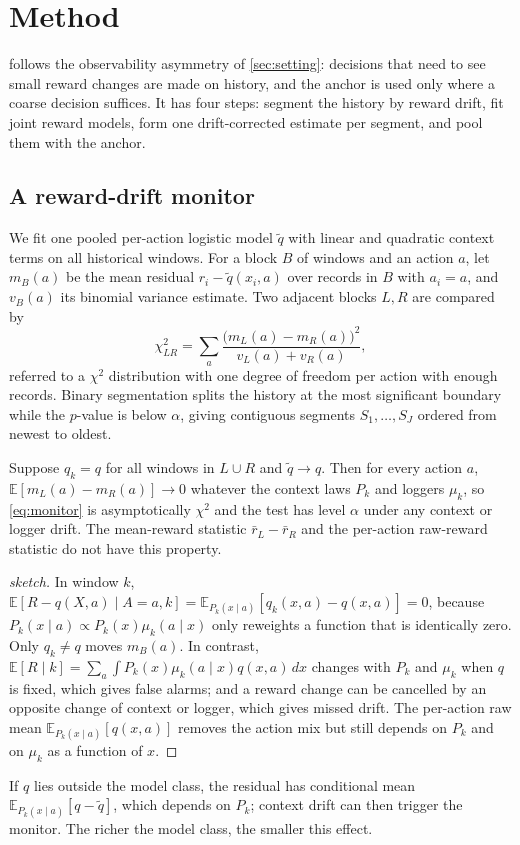 \section{Method}\label{sec:method}

\odrift{} follows the observability asymmetry of \cref{sec:setting}: decisions that need to
see small reward changes are made on history, and the anchor is used only where a coarse
decision suffices. It has four steps: segment the history by reward drift, fit joint
reward models, form one drift-corrected estimate per segment, and pool them with the anchor.

\subsection{A reward-drift monitor}
We fit one pooled per-action logistic model $\tilde q$ with linear and quadratic context
terms on all historical windows. For a block $B$ of windows and an action $a$, let
$m_B(a)$ be the mean residual $r_i-\tilde q(x_i,a)$ over records in $B$ with $a_i=a$, and
$v_B(a)$ its binomial variance estimate. Two adjacent blocks $L,R$ are compared by
\begin{equation}\label{eq:monitor}
  \chi^2_{LR}=\sum_{a}\frac{\big(m_L(a)-m_R(a)\big)^2}{v_L(a)+v_R(a)},
\end{equation}
referred to a $\chi^2$ distribution with one degree of freedom per action with enough
records. Binary segmentation splits the history at the most significant boundary while
the $p$-value is below $\alpha$, giving contiguous segments $S_1,\dots,S_J$ ordered from
newest to oldest.

\begin{proposition}\label{prop:invariance}
Suppose $q_k=q$ for all windows in $L\cup R$ and $\tilde q\to q$. Then for every action
$a$, $\mathbb{E}[m_L(a)-m_R(a)]\to0$ whatever the context laws $P_k$ and loggers $\mu_k$,
so \eqref{eq:monitor} is asymptotically $\chi^2$ and the test has level $\alpha$ under
any context or logger drift. The mean-reward statistic $\bar r_L-\bar r_R$ and the
per-action raw-reward statistic do not have this property.
\end{proposition}
\begin{proof}[sketch]
In window $k$, $\mathbb{E}[R-q(X,a)\mid A=a,k]=\mathbb{E}_{P_k(x\mid a)}[q_k(x,a)-q(x,a)]=0$,
because $P_k(x\mid a)\propto P_k(x)\mu_k(a\mid x)$ only reweights a function that is
identically zero. Only $q_k\neq q$ moves $m_B(a)$. In contrast,
$\mathbb{E}[R\mid k]=\sum_a\int P_k(x)\mu_k(a\mid x)q(x,a)\,dx$ changes with $P_k$ and
$\mu_k$ when $q$ is fixed, which gives false alarms; and a reward change can be cancelled
by an opposite change of context or logger, which gives missed drift. The per-action raw
mean $\mathbb{E}_{P_k(x\mid a)}[q(x,a)]$ removes the action mix but still depends on
$P_k$ and on $\mu_k$ as a function of $x$.
\end{proof}
If $q$ lies outside the model class, the residual has conditional mean
$\mathbb{E}_{P_k(x\mid a)}[q-\tilde q]$, which depends on $P_k$; context drift can then
trigger the monitor. The richer the model class, the smaller this effect.

